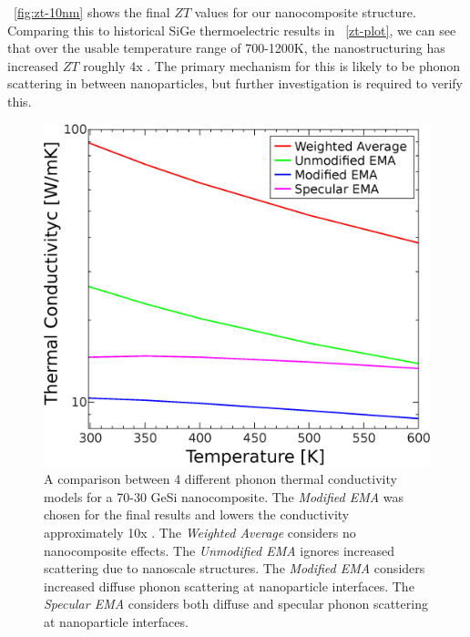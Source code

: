 \documentclass[12pt]{article}
\newcommand{\figref}[2][\figurename~]{#1\ref{#2}}
\newcommand{\tms}{\textsf{x} }
\begin{document}
\figref{fig:zt-10nm} shows the final $ZT$ values for our nanocomposite structure. Comparing this to historical SiGe thermoelectric results in \figref{zt-plot}, we can see that over the usable temperature range of 700-1200K, the nanostructuring has increased $ZT$ roughly 4\tms. The primary mechanism for this is likely to be phonon scattering in between nanoparticles, but further investigation is required to verify this.

\begin{figure}
	\centering
	\includegraphics[width=\textwidth]{mEMA-temp-10nm-log.eps}
	\caption{A comparison between 4 different phonon thermal conductivity models for a 70-30 GeSi nanocomposite. The \emph{Modified EMA} was chosen for the final results and lowers the conductivity approximately 10\tms. The \emph{Weighted Average} considers no nanocomposite effects. The \emph{Unmodified EMA} \cite{ema} ignores increased scattering due to nanoscale structures. The \emph{Modified EMA} \cite{mema} considers increased diffuse phonon scattering at nanoparticle interfaces. The \emph{Specular EMA} \cite{sema} considers both diffuse and specular phonon scattering at nanoparticle interfaces.}
	\label{fig:mEMA-temp-10nm-log}
\end{figure}
\end{document}
